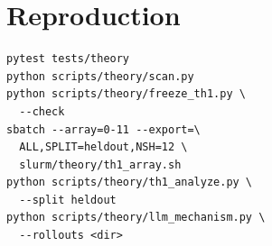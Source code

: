 \section{Reproduction}\label{app3:repro}
{\footnotesize\begin{verbatim}
pytest tests/theory
python scripts/theory/scan.py
python scripts/theory/freeze_th1.py \
  --check
sbatch --array=0-11 --export=\
  ALL,SPLIT=heldout,NSH=12 \
  slurm/theory/th1_array.sh
python scripts/theory/th1_analyze.py \
  --split heldout
python scripts/theory/llm_mechanism.py \
  --rollouts <dir>
\end{verbatim}}
